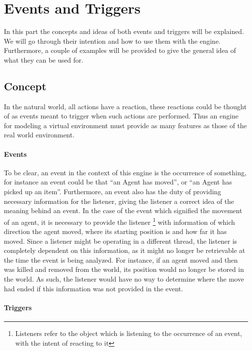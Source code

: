 
\section{Events and Triggers}

In this part the concepts and ideas of both events and triggers will
be explained. We will go through their intention and how to use them
with the engine. Furthermore, a couple of examples will be provided
to give the general idea of what they can be used for. 


\subsection{Concept}

In the natural world, all actions have a reaction, these reactions
could be thought of as events meant to trigger when such actions are
performed. Thus an engine for modeling a virtual environment must
provide as many features as those of the real world environment.


\paragraph*{Events}

To be clear, an event in the context of this engine is the occurrence
of something, for instance an event could be that \textquotedblleft{}an
Agent has moved\textquotedblright{}, or \textquotedblleft{}an Agent
has picked up an item\textquotedblright{}. Furthermore, an event also
has the duty of providing necessary information for the listener,
giving the listener a correct idea of the meaning behind an event.
In the case of the event which signified the movement of an agent,
it is necessary to provide the listener %
\footnote{Listeners refer to the object which is listening to the occurrence
of an event, with the intent of reacting to it%
} with information of which direction the agent moved, where its starting
position is and how far it has moved. Since a listener might be operating
in a different thread, the listener is completely dependent on this
information, as it might no longer be retrievable at the time the
event is being analyzed. For instance, if an agent moved and then
was killed and removed from the world, its position would no longer
be stored in the world. As such, the listener would have no way to
determine where the move had ended if this information was not provided
in the event.


\paragraph*{Triggers}

